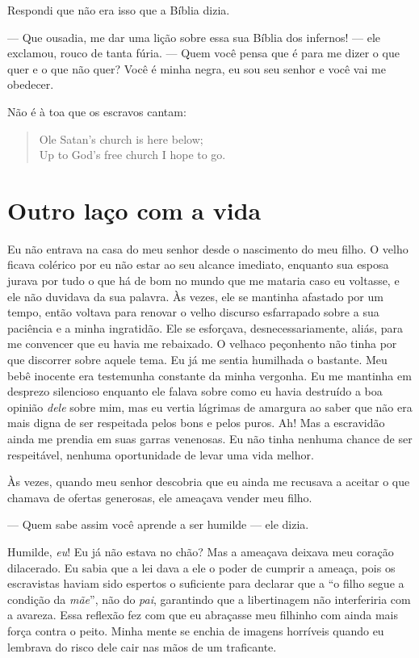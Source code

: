 Respondi que não era isso que a Bíblia
dizia.

--- Que ousadia, me dar uma lição sobre
essa sua Bíblia dos infernos! --- ele exclamou, rouco de tanta fúria.
--- Quem você pensa que é para me dizer o que quer e o que não quer?
Você é minha negra, eu sou seu senhor e você vai me obedecer.

Não é à toa que os escravos cantam:

\begin{verse}
Ole Satan's church is here below;\\
Up to God's free church I hope to go.\footnotemark
\end{verse}

\chapter*{Outro laço com a vida}

Eu não entrava na casa do meu senhor
desde o nascimento do meu filho. O velho ficava colérico por eu não
estar ao seu alcance imediato, enquanto sua esposa jurava por tudo o que
há de bom no mundo que me mataria caso eu voltasse, e ele não duvidava
da sua palavra. Às vezes, ele se mantinha afastado por um tempo, então
voltava para renovar o velho discurso esfarrapado sobre a sua paciência
e a minha ingratidão. Ele se esforçava, desnecessariamente, aliás, para
me convencer que eu havia me rebaixado. O velhaco peçonhento não tinha
por que discorrer sobre aquele tema. Eu já me sentia humilhada o
bastante. Meu bebê inocente era testemunha constante da minha vergonha.
Eu me mantinha em desprezo silencioso enquanto ele falava sobre como eu
havia destruído a boa opinião \emph{dele} sobre mim, mas eu vertia
lágrimas de amargura ao saber que não era mais digna de ser respeitada
pelos bons e pelos puros. Ah! Mas a escravidão ainda me prendia em suas
garras venenosas. Eu não tinha nenhuma chance de ser respeitável,
nenhuma oportunidade de levar uma vida melhor.

Às vezes, quando meu senhor descobria
que eu ainda me recusava a aceitar o que chamava de ofertas generosas,
ele ameaçava vender meu filho.

--- Quem sabe assim você aprende a ser humilde --- ele dizia.

Humilde, \emph{eu}! Eu já não estava no
chão? Mas a ameaçava deixava meu coração dilacerado. Eu sabia que a lei
dava a ele o poder de cumprir a ameaça, pois os escravistas haviam sido
espertos o suficiente para declarar que a ``o filho segue a condição da
\emph{mãe}'', não do \emph{pai}, garantindo que a libertinagem não
interferiria com a avareza. Essa reflexão fez com que eu abraçasse meu
filhinho com ainda mais força contra o peito. Minha mente se enchia de
imagens horríveis quando eu lembrava do risco dele cair nas mãos de um
traficante.

